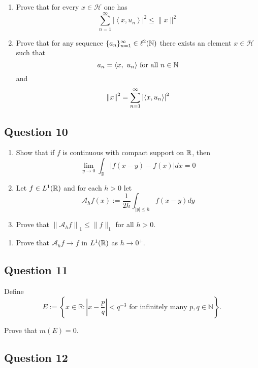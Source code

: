 \documentclass[12pt]{article}
\providecommand{\tightlist}{%
  \setlength{\itemsep}{0pt}\setlength{\parskip}{0pt}}
\begin{document}
\begin{enumerate}
\def\labelenumi{\alph{enumi}.}
\item
  Prove that for every \(x \in \mathcal H\) one has \[
  \displaystyle\sum_{n=1}^{\infty}\left|\left\langle x, u_{n}\right\rangle\right|^{2} \leq\|x\|^{2}
  \]
\item
  Prove that for any sequence \(\{a_n\}_{n=1}^\infty \in \ell^2({\mathbb{N}})\)
  there exists an element \(x\in\mathcal H\) such that \[
  a_n = {\left\langle {x},~{u_n} \right\rangle} \text{ for all } n\in {\mathbb{N}}
  \] and \[
  {\left\lVert {x} \right\rVert}^2 = \sum_{n=1}^{\infty}\left|\left\langle x, u_{n}\right\rangle\right|^{2}
  \]
\end{enumerate}

\hypertarget{question-10-1}{%
\subsection{Question 10}\label{question-10-1}}

\begin{enumerate}
\def\labelenumi{\alph{enumi}.}
\item
  Show that if \(f\) is continuous with compact support on \({\mathbb{R}}\), then
  \[
  \lim _{y \rightarrow 0} \int_{\mathbb{R}}|f(x-y)-f(x)| d x=0
  \]
\item
  Let \(f\in L^1({\mathbb{R}})\) and for each \(h > 0\) let \[
  \mathcal{A}_{h} f(x):=\frac{1}{2 h} \int_{|y| \leq h} f(x-y) d y
  \]
\item
  Prove that \(\left\|\mathcal{A}_{h} f\right\|_{1} \leq\|f\|_{1}\) for
  all \(h > 0\).
\end{enumerate}

\begin{enumerate}
\def\labelenumi{\roman{enumi}.}
\setcounter{enumi}{1}
\tightlist
\item
  Prove that \(\mathcal{A}_h f \to f\) in \(L^1({\mathbb{R}})\) as \(h \to 0^+\).
\end{enumerate}

\hypertarget{question-11-1}{%
\subsection{Question 11}\label{question-11-1}}

Define \[
E:=\left\{x \in \mathbb{R}:\left|x-\frac{p}{q}\right|<q^{-3} \text { for infinitely many } p, q \in \mathbb{N}\right\}.
\]

Prove that \(m(E) = 0\).

\hypertarget{question-12-1}{%
\subsection{Question 12}\label{question-12-1}}
\end{document}
